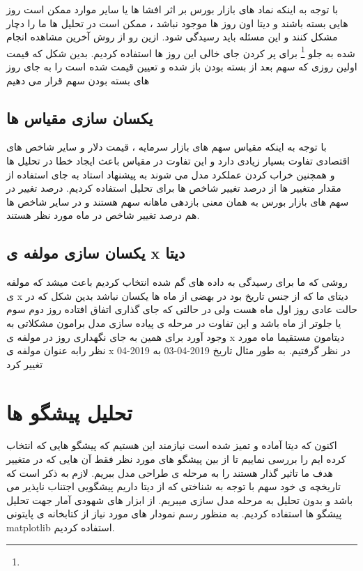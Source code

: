 \documentclass[12pt]{report}
\begin{document}
با توجه به اینکه نماد های بازار بورس  بر اثر افشا ها یا سایر موارد ممکن است روز هایی بسته باشند و دیتا اون روز ها موجود نباشد ، ممکن است در تحلیل ها ما را دچار مشکل کنند و این مسئله باید رسیدگی شود. ازین رو از روش 
آخرین مشاهده انجام شده به جلو
\footnote{}
برای پر کردن جای خالی این روز ها استفاده کردیم. بدین شکل که قیمت اولین روزی که سهم بعد از بسته بودن باز شده و تعیین قیمت شده است را به جای روز های بسته بودن سهم قرار می دهیم

\subsection{یکسان سازی مقیاس ها}
با توجه به اینکه مقیاس سهم های بازار سرمایه ، قیمت دلار و سایر شاخص های اقتصادی تفاوت بسیار زیادی دارد و این تفاوت در مقیاس باعث ایجاد خطا در تحلیل ها و همچنین خراب کردن عملکرد مدل می شوند به پیشنهاد استاد به جای استفاده از مقدار متغییر ها از درصد تغییر شاخص ها برای تحلیل استفاده کردیم. درصد تغییر در سهم های بازار بورس به همان معنی بازدهی ماهانه سهم هستند و در سایر شاخص ها هم درصد تغییر شاخص در ماه مورد نظر هستند.
\subsection{یکسان سازی مولفه ی x دیتا}
روشی که ما برای رسیدگی به داده های گم شده انتخاب کردیم باعث میشد که مولفه ی x دیتای ما که از جنس تاریخ بود در بهضی از ماه ها یکسان نباشد بدین شکل که در حالت عادی روز اول ماه هست ولی در حالتی که جای گذاری اتفاق افتاده روز دوم سوم یا جلوتر از ماه باشد و این تفاوت در مرحله ی پیاده سازی مدل برامون مشکلاتی به وجود آورد برای همین به جای نگهداری روز در مولفه ی x دیتامون مستقیما ماه مورد نظر رابه عنوان مولفه ی  x در نظر گرفتیم. به طور مثال تاریخ 2019-04-03 به 2019-04 تغییر کرد

\section{تحلیل پیشگو ها}
اکنون که دیتا آماده و تمیز شده است نیازمند این هستیم که پیشگو هایی که انتخاب کرده ایم را بررسی نماییم تا از بین پیشگو های مورد نظر فقط آن هایی که در متغییر هدف ما تاثیر گذار هستند  را به مرحله ی طراحی مدل ببریم. لازم به ذکر است که تاریخچه ی خود سهم با توجه به شناختی که از دیتا داریم پیشگویی اجتناب ناپذیر می باشد و بدون تحلیل به مرحله مدل سازی میبریم. از ابزار های شهودی آمار جهت تحلیل پیشگو ها استفاده کردیم. به منظور رسم نمودار های مورد نیاز از کتابخانه ی پایتونی matplotlib استفاده کردیم.
\end{document}
